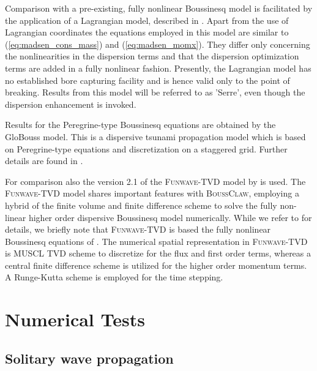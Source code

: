 \documentclass[review]{elsarticle}
\begin{document}
Comparison with a pre-existing, fully nonlinear Boussinesq model is
facilitated by the application of a Lagrangian model, described
in \citet{Lovholt:2013a}. Apart from the use of
Lagrangian coordinates the equations employed in this model are
 similar to (\ref{eq:madsen_cons_mass}) and (\ref{eq:madsen_momx}).
They differ only concerning the nonlinearities in the
dispersion terms and that  the dispersion optimization terms are added in a fully nonlinear fashion.
Presently, the Lagrangian model has no established bore capturing 
facility and is hence valid only to the point of breaking.
Results from this model will be referred to as 'Serre', even though
the dispersion enhancement is invoked. 
 
Results for the Peregrine-type Boussinesq equations are obtained by the
GloBouss model. This is a dispersive tsunami propagation model which
is based on Peregrine-type equations and discretization on a staggered grid. Further details are found in 
\citet{Lovholt:2008b}.

For comparison also the version 2.1 of the  \textsc{Funwave-TVD} model
by \citet{shi2012high} is used. The
\textsc{Funwave-TVD} model shares important features with \textsc{BoussClaw}, employing a hybrid 
of the finite volume and finite difference
scheme to solve the fully non-linear higher order dispersive Boussinesq model numerically.
While we refer to \citet{shi2012high} for details, we briefly note that \textsc{Funwave-TVD} is based the fully nonlinear 
Boussinesq equations of \citet{Chen06}. The numerical spatial representation in \textsc{Funwave-TVD} is MUSCL TVD scheme 
to discretize for the flux and first order terms, 
whereas a central finite difference
scheme \citet{Wei95} is utilized for the higher order momentum terms. A Runge-Kutta scheme is employed for the time stepping.

\section{Numerical Tests}
\label{sec:num_nonbreaking}

\subsection{Solitary wave propagation}
\end{document}
